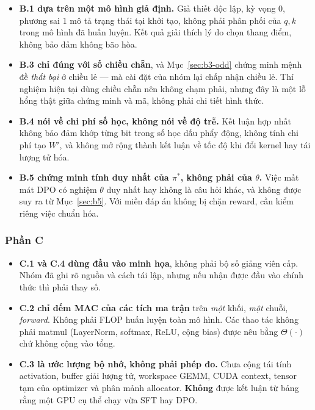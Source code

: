 \begin{itemize}[leftmargin=2em]
\item \textbf{B.1 dựa trên một mô hình giả định.} Giả thiết độc lập, kỳ vọng $0$,
phương sai $1$ mô tả trạng thái tại khởi tạo, không phải phân phối của $q,k$ trong
mô hình đã huấn luyện. Kết quả giải thích lý do chọn thang điểm, không bảo đảm
không bão hòa.
\item \textbf{B.3 chỉ đúng với số chiều chẵn}, và Mục~\ref{sec:b3-odd} chứng minh
mệnh đề \emph{thất bại} ở chiều lẻ --- mà cài đặt của nhóm lại chấp nhận chiều lẻ.
Thí nghiệm hiện tại dùng chiều chẵn nên không chạm phải, nhưng đây là một lỗ hổng
thật giữa chứng minh và mã, không phải chi tiết hình thức.
\item \textbf{B.4 nói về chi phí số học, không nói về độ trễ.} Kết luận hợp nhất
không bảo đảm khớp từng bit trong số học dấu phẩy động, không tính chi phí tạo
$W'$, và không mở rộng thành kết luận về tốc độ khi đổi kernel hay tái lượng tử
hóa.
\item \textbf{B.5 chứng minh tính duy nhất của $\pi^*$, không phải của $\theta$.}
Việc mất mát DPO có nghiệm $\theta$ duy nhất hay không là câu hỏi khác, và không
được suy ra từ Mục~\ref{sec:b5}. Với miền đáp án không bị chặn reward, cần kiểm
riêng việc chuẩn hóa.
\end{itemize}

\subsubsection{Phần C}

\begin{itemize}[leftmargin=2em]
\item \textbf{C.1 và C.4 dùng đầu vào minh họa}, không phải bộ số giảng viên cấp.
Nhóm đã ghi rõ nguồn và cách tái lập, nhưng nếu nhận được đầu vào chính thức thì
phải thay số.
\item \textbf{C.2 chỉ đếm MAC của các tích ma trận} trên \emph{một} khối,
\emph{một} chuỗi, \emph{forward}. Không phải FLOP huấn luyện toàn mô hình. Các thao
tác không phải matmul (LayerNorm, softmax, ReLU, cộng bias) được nêu bằng
$\Theta(\cdot)$ chứ không cộng vào tổng.
\item \textbf{C.3 là ước lượng bộ nhớ, không phải phép đo.} Chưa cộng tái tính
activation, buffer giải lượng tử, workspace GEMM, CUDA context, tensor tạm của
optimizer và phân mảnh allocator. \textbf{Không} được kết luận từ bảng rằng một GPU
cụ thể chạy vừa SFT hay DPO.
\end{itemize}

